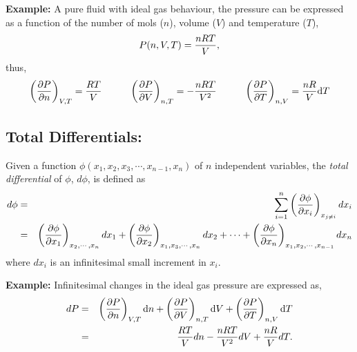 {\bf Example:} A pure fluid with ideal gas behaviour, the pressure can be expressed as a function of the number of mols ($n$), volume ($V$) and temperature ($T$),
  \begin{displaymath}
     P(n,V,T) = \displaystyle\frac{n R T}{V},
  \end{displaymath}
thus,
  \begin{displaymath}
     \left(\displaystyle\frac{\partial P}{\partial n}\right)_{V,T} = \displaystyle\frac{RT}{V}\hspace{1cm} \left(\displaystyle\frac{\partial P}{\partial V}\right)_{n,T} = -\displaystyle\frac{n R T}{V^{2}} \hspace{1cm} \left(\displaystyle\frac{\partial P}{\partial T}\right)_{n,V} = \displaystyle\frac{n R}{V}\mathrm{d}{T}
  \end{displaymath}


\subsection{Total Differentials:} Given a function $\phi\left(x_{1},x_{2},x_{3},\cdots,x_{n-1},x_{n}\right)$ of $n$ independent variables, the {\it total differential} of $\phi$, $d\phi$, is defined as
  \begin{eqnarray}
     d\phi &=& \sum\limits_{i=1}^{n}\left(\displaystyle\frac{\partial \phi}{\partial x_{i}}\right)_{x_{j\neq i}} d x_{i} \nonumber \\
     &=& \left(\displaystyle\frac{\partial\phi}{\partial x_{1}}\right)_{x_{2},\cdots,x_{n}} d x_{1} + \left(\displaystyle\frac{\partial\phi}{\partial x_{2}}\right)_{x_{1},x_{3},\cdots,x_{n}} dx_{2} + \cdots +  \left(\displaystyle\frac{\partial\phi}{\partial x_{n}}\right)_{x_{1},x_{2},\cdots,x_{n-1}} d x_{n} \nonumber 
  \end{eqnarray}
where $d x_{i}$ is an infinitesimal small increment in $x_{i}$.

\noindent
{\bf Example:} Infinitesimal changes in the ideal gas pressure are expressed as,
  \begin{eqnarray}
      d P &=& \left(\displaystyle\frac{\partial P}{\partial n}\right)_{V,T}\mathrm{d}{n} + \left(\displaystyle\frac{\partial P}{\partial V}\right)_{n,T}\mathrm{d}{V} + \left(\displaystyle\frac{\partial P}{\partial T}\right)_{n,V}\mathrm{d}{T} \nonumber \\
     &=& \displaystyle\frac{R T}{V} d n - \displaystyle\frac{n R T}{V^{2}} d V + \displaystyle\frac{n R}{V} d T. \nonumber 
  \end{eqnarray}

